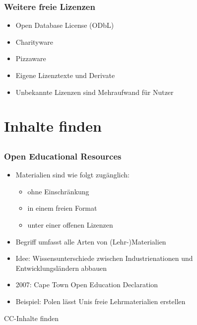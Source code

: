 \documentclass[table]{beamer}
\begin{document}
\begin{frame}
    \frametitle{Weitere freie Lizenzen}
    \begin{itemize}
        \item<2-> Open Database License (ODbL)
        \item<3-> Charityware
        \item<4-> Pizzaware
        \item<5-> Eigene Lizenztexte und Derivate
        \item<6-> Unbekannte Lizenzen sind Mehraufwand für Nutzer
    \end{itemize}
\end{frame}

\section{Inhalte finden}
\subsection{}

\begin{frame}
  \frametitle{Open Educational Resources}
    \begin{itemize}
        \item<2-> Materialien sind wie folgt zugänglich:
            \begin{itemize}
                \item<3-> ohne Einschränkung
                \item<4-> in einem freien Format
                \item<5-> unter einer offenen Lizenzen 
            \end{itemize}
        \item<6-> Begriff umfasst alle Arten von (Lehr-)Materialien
        \item<7-> Idee: Wissensunterschiede zwischen Industrienationen und Entwicklungsländern abbauen
        \item<8-> 2007: Cape Town Open Education Declaration
        \item<9-> Beispiel: Polen lässt Unis freie Lehrmaterialien erstellen
    \end{itemize}
\end{frame}

\begin{frame}
    \begin{center}\Large
    CC-Inhalte finden
    \end {center}
\end{frame}
\end{document}
